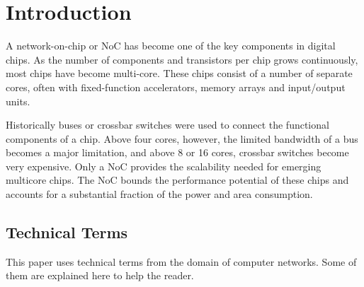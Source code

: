 
\newcommand{\docTitle}{The Spidergon Network-on-Chip}
\newcommand{\docAuthor}{Andrew Fecheyr Lippens}
\newcommand{\docDate}{\today}
\newcommand{\docSubject}{Redes en Chip}







\begin{abstract}
\end{abstract}

\setcounter{tocdepth}{2}
\begin{tableofcontents}
\end{tableofcontents}

\newpage

\section{Introduction}\label{C:intro}
	
A network-on-chip or NoC has become one of the key components in digital chips. 
As the number of components and transistors per chip grows continuously, most chips have become multi-core. 
These chips consist of a number of separate cores, often with fixed-function accelerators, memory arrays and input/output units.
		
Historically buses or crossbar switches were used to connect the functional components of a chip. 
Above four cores, however, the limited bandwidth of a bus becomes a major limitation, and above 8 or 16 cores, crossbar switches become very expensive. 
Only a NoC provides the scalability needed for emerging multicore chips. 
The NoC bounds the performance potential of these chips and accounts for a substantial fraction of the power and area consumption.

\subsection{Technical Terms}\label{S:terms}
	
This paper uses technical terms from the domain of computer networks. 
Some of them are explained here to help the reader.

